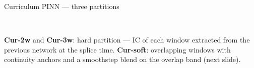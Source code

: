 \documentclass[aspectratio=169, 11pt]{beamer}
\begin{document}
\begin{frame}{Curriculum PINN --- three partitions}
{}
  \\[6pt]
  \begin{minipage}{0.92\textwidth}
    \centering\scriptsize
    \textbf{Cur-2w} and \textbf{Cur-3w}: hard partition --- IC of each window
    extracted from the previous network at the splice time.
    \textbf{Cur-soft}: overlapping windows with continuity anchors and a
    smoothstep blend on the overlap band (next slide).
  \end{minipage}
\end{frame}
\end{document}
